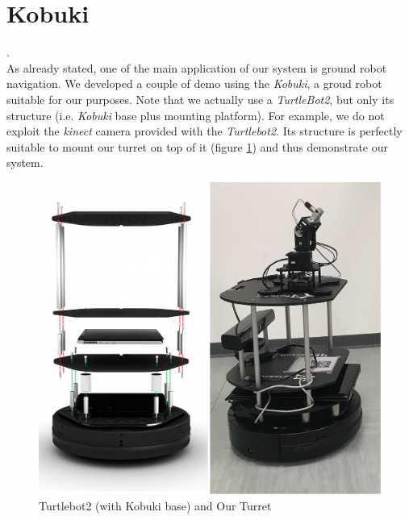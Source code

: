 \section{Kobuki}
 \cite{kobuki}.\\
As already stated, one of the main application of our system is ground robot navigation. We developed a couple of demo using the \emph{Kobuki}, a groud robot suitable for our purposes. Note that we actually use a \emph{TurtleBot2}, but only its structure (i.e. \emph{Kobuki} base plus mounting platform). For example, we do not exploit the \emph{kinect} camera provided with the \emph{Turtlebot2}. Its structure is perfectly suitable to mount our turret on top of it (figure \ref{fig:kobukiTurret}) and thus demonstrate our system.
\begin{figure}
	\centering
	\includegraphics[width=\textwidth]{img/kobukiHWLow.png}%
	\caption{Turtlebot2 (with Kobuki base) and Our Turret}
	\label{fig:kobukiTurret}
\end{figure}